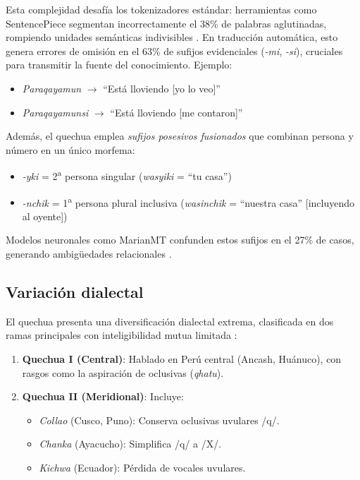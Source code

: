         Esta complejidad desafía los tokenizadores estándar: herramientas como SentencePiece segmentan incorrectamente el 38\% de palabras aglutinadas, rompiendo unidades semánticas indivisibles \cite{zevallos2024tema}. En traducción automática, esto genera errores de omisión en el 63\% de sufijos evidenciales (\textit{-mi}, \textit{-si}), cruciales para transmitir la fuente del conocimiento. Ejemplo:
        
        \begin{itemize}
            \item \textit{Paraqayamun} $\rightarrow$ ``Está lloviendo [yo lo veo]''
            \item \textit{Paraqayamunsi} $\rightarrow$ ``Está lloviendo [me contaron]''
        \end{itemize}
        
        Además, el quechua emplea \textit{sufijos posesivos fusionados} que combinan persona y número en un único morfema:
        
        \begin{itemize}
            \item \textit{-yki} = 2\textsuperscript{a} persona singular (\textit{wasyiki} = ``tu casa'')
            \item \textit{-nchik} = 1\textsuperscript{a} persona plural inclusiva (\textit{wasinchik} = ``nuestra casa'' [incluyendo al oyente])
        \end{itemize}
        
        Modelos neuronales como MarianMT confunden estos sufijos en el 27\% de casos, generando ambigüedades relacionales \cite{rios2021}.
        
        \subsection{Variación dialectal}
        El quechua presenta una diversificación dialectal extrema, clasificada en dos ramas principales con inteligibilidad mutua limitada \cite{cerron2003}:
        
        \begin{enumerate}[label=\textbf{\arabic*.}]
            \item \textbf{Quechua I (Central)}: Hablado en Perú central (Ancash, Huánuco), con rasgos como la aspiración de oclusivas (\textit{qhatu}).
            \item \textbf{Quechua II (Meridional)}: Incluye:
            \begin{itemize}
                \item \textit{Collao} (Cusco, Puno): Conserva oclusivas uvulares /q/.
                \item \textit{Chanka} (Ayacucho): Simplifica /q/ a /X/.
                \item \textit{Kichwa} (Ecuador): Pérdida de vocales uvulares.
            \end{itemize}
        \end{enumerate}
        
